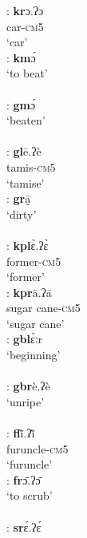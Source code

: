 \documentclass[output=paper]{langscibook}
\begin{document}
\begin{exe}
\begin{multicols}{2}
\begin{xlisti}
        \ex \glll  [kr]:       \textbf{kr}ɔ.ʔɔ \\
            {} car-\textsc{cm}5\\
           {}  `car'\\
        \ex \glll [km]:      \textbf{km}ɔ́\\
            {}      {`to beat'}\\
            {} {} \\
        \ex \glll [gm]:      \textbf{gm}ɔ́\\
            {}      `beaten'\\
            {} {} \\
        \ex \glll [gl]:       \textbf{gl}ē.ʔè\\
            {}          tamis-\textsc{cm}5\\
            {} ‘tamise’\\
        \ex \glll [gr]:       \textbf{gr}ā̰  \\
            {}      `dirty'\\
            {} {}\\
        \ex  \glll [kpl]:      \textbf{kpl}ɛ̀.ʔɛ̀ \\
            {}          former-\textsc{cm}5\\
            {}          `former'\\
        \ex \glll [kpr]:     \textbf{kpr}ā.ʔā\\
            {}          {sugar cane-\textsc{cm}5}\\
            {} {`sugar cane'}\\
        \ex \glll [gbl]:     \textbf{gbl}ɛ̀ːr\\
            {}          `beginning'\\
            {} {}\\
        \ex \glll [gbr]:     \textbf{gbr}è.ʔè\\
            {}          `unripe'\\
            {} {}\\
        \ex \glll [fl]: \textbf{fl}ĩ̀.ʔĩ̀  \\
            {} furuncle-\textsc{cm}5\\
            {} `furuncle'\\
        \ex \glll [fr]:        \textbf{fr}ɔ̄.ʔɔ̄ \\
            {} {`to scrub'}\\
            {} {} \\
        \ex \glll [sr]:        \textbf{sr}ɛ́.ʔɛ́\\

\end{xlisti}
\end{multicols}
\end{exe}
\end{document}
